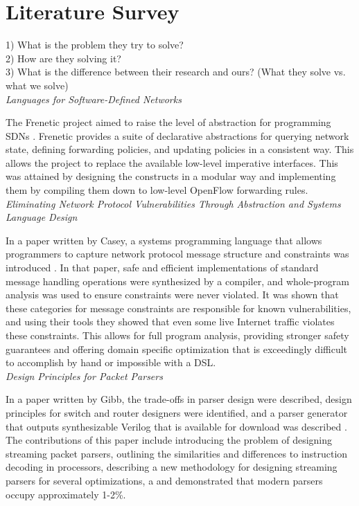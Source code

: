 
\section{Literature Survey}
1) What is the problem they try to solve? \\
2) How are they solving it? \\
3) What is the difference between their research and ours?  (What they solve vs.
what we solve) \\


\noindent \emph{Languages for Software-Defined Networks}

The Frenetic project aimed to raise the level of abstraction for 
programming SDNs \cite{Foster2013}. Frenetic provides a suite of declarative
abstractions 
for querying network state, defining forwarding policies, and updating 
policies in a consistent way. This allows the project to replace the 
available low-level imperative interfaces. This was attained by designing 
the constructs in a modular way and implementing them by compiling
them down to low-level OpenFlow forwarding rules. \\

\noindent \emph{Eliminating Network Protocol Vulnerabilities Through Abstraction
	and Systems Language Design}

In a paper written by Casey, a systems programming language that allows
programmers to capture network protocol message structure and constraints was
introduced \cite{Casey2013}. In that paper, safe and efficient implementations
of standard message handling operations were synthesized by a compiler, and
whole-program analysis was used to ensure constraints were never violated. It
was shown that these categories for message constraints are responsible for known
vulnerabilities, and using their tools they showed that even some live Internet traffic 
violates these constraints.
This allows for full program analysis, providing stronger safety guarantees and offering 
domain 
specific optimization that is exceedingly difficult to accomplish by hand or impossible
with a DSL. \\ 

\noindent \emph{Design Principles for Packet Parsers}

In a paper written by Gibb, the trade-offs in parser design were described, design
principles for switch and router designers were identified, and a parser generator that
outputs synthesizable Verilog that is available for download was described
\cite{Gibb2013}. The
contributions of this paper include introducing the problem of designing streaming packet
parsers, outlining the similarities and differences to instruction decoding in processors,
describing a new methodology for designing streaming parsers for several optimizations, a
and demonstrated that modern parsers occupy approximately 1-2\%. \\

